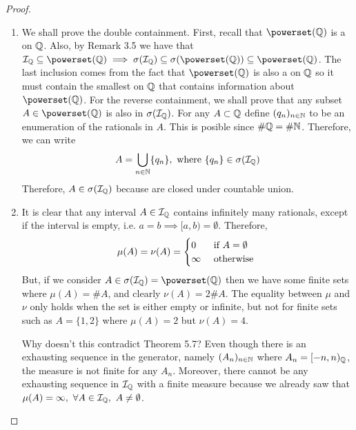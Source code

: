 \begin{proof}$ $\newline
	\begin{enumerate}
		\item We shall prove the double containment. First, recall that $\powerset(\Q)$ is a \siga on $\mathbb{Q}$. Also, by Remark 3.5 we have that $\calI_\Q \subseteq \powerset(\Q) \implies \sigma(\calI_\Q) \subseteq \sigma(\powerset(\Q)) \subseteq \powerset(\Q)$. The last inclusion comes from the fact that $\powerset(\Q)$ is also a \siga on $\mathbb{Q}$ so it must contain the smallest \siga on $\mathbb{Q}$ that contains information about $\powerset(\Q)$. For the reverse containment, we shall prove that any subset $A \in \powerset(\Q)$ is also in $\sigma(\mathcal{I}_{\mathbb{Q}})$. For any $A \subset \mathbb{Q}$ define $(q_n)_{n \in \mathbb{N}}$ to be an enumeration of the rationals in $A$. This is posible since $\# \mathbb{Q} = \# \mathbb{N}$. Therefore, we can write
		\begin{align*}
			A = \bigcup_{n \in \mathbb{N}} \{q_n\},\text{ where } \{q_n\} \in \sigma(\mathcal{I}_{\mathbb{Q}})
		\end{align*}
		Therefore, $A \in \sigma(\mathcal{I}_{\mathbb{Q}})$ because \sigas are closed under countable union.
		
		\item It is clear that any interval $A \in \mathcal{I}_{\mathbb{Q}}$ contains infinitely many rationals, except if the interval is empty, i.e. $a = b \implies [a,b) = \emptyset$. Therefore,
		\begin{align*}
			\mu(A) = \nu(A) = \begin{cases}
			0       \tif A = \emptyset \\
			\infty &\text{ otherwise }
			\end{cases}
		\end{align*}
		But, if we consider $A \in \sigma(\calI_\Q) = \powerset(\Q)$ then we have some finite sets where $\mu(A) = \# A$, and clearly $\nu(A) = 2 \# A$. The equality between $\mu$ and $\nu$ only holds when the set is either empty or infinite, but not for finite sets such as $A = \{1, 2\}$ where $\mu(A) = 2$ but $\nu(A) = 4$.
		
		Why doesn't this contradict Theorem 5.7? Even though there is an exhausting sequence in the generator, namely $(A_n)_{n\in\mathbb{N}}$ where $A_n = [-n, n)_{\mathbb{Q}}$, the measure is not finite for any $A_n$. Moreover, there cannot be any exhausting sequence in $\mathcal{I}_{\mathbb{Q}}$ with a finite measure because we already saw that $\mu(A) = \infty,\ \forall A \in \mathcal{I}_{\mathbb{Q}},\ A \neq \emptyset$.
	\end{enumerate}
\end{proof}

